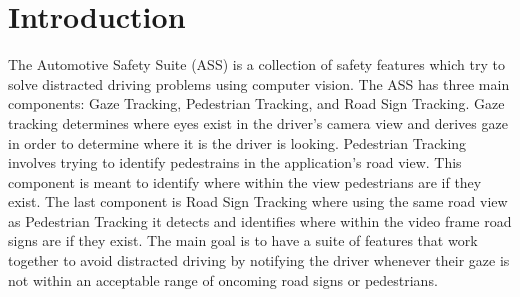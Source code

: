 \section{Introduction}

The Automotive Safety Suite (ASS) is a collection of safety features which try to solve distracted driving problems using computer vision. The ASS has three main components: Gaze Tracking, Pedestrian Tracking, and Road Sign Tracking. Gaze tracking determines where eyes exist in the driver's camera view and derives gaze in order to determine where it is the driver is looking. Pedestrian Tracking involves trying to identify pedestrains in the application's road view. This component is meant to identify where within the view pedestrians are if they exist. The last component is Road Sign Tracking where using the same road view as Pedestrian Tracking it detects and identifies where within the video frame road signs are if they exist. The main goal is to have a suite of features that work together to avoid distracted driving by notifying the driver whenever their gaze is not within an acceptable range of oncoming road signs or pedestrians.